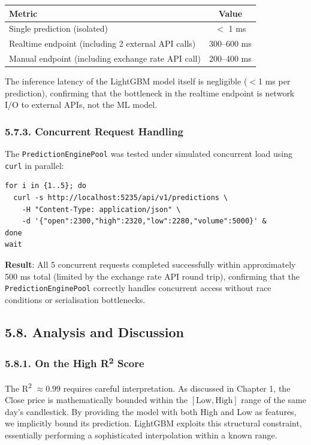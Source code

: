 \begin{center}
\begin{tabular}{|l|c|}
\hline
\textbf{Metric} & \textbf{Value}\\
\hline
Single prediction (isolated) & $<$ 1 ms\\
Realtime endpoint (including 2 external API calls) & 300--600 ms\\
Manual endpoint (including exchange rate API call) & 200--400 ms\\
\hline
\end{tabular}
\end{center}

The inference latency of the LightGBM model itself is negligible ($<$1 ms per prediction), confirming that the bottleneck in the realtime endpoint is network I/O to external APIs, not the ML model.

\subsubsection{5.7.3. Concurrent Request Handling}
The \texttt{PredictionEnginePool} was tested under simulated concurrent load using \texttt{curl} in parallel:

\begin{lstlisting}[language={}, numbers=none]
for i in {1..5}; do
  curl -s http://localhost:5235/api/v1/predictions \
    -H "Content-Type: application/json" \
    -d '{"open":2300,"high":2320,"low":2280,"volume":5000}' &
done
wait
\end{lstlisting}

\textbf{Result}: All 5 concurrent requests completed successfully within approximately 500 ms total (limited by the exchange rate API round trip), confirming that the \texttt{PredictionEnginePool} correctly handles concurrent access without race conditions or serialisation bottlenecks.

\subsection{5.8. Analysis and Discussion}

\subsubsection{5.8.1. On the High R\textsuperscript{2} Score}
The R\textsuperscript{2} $\approx 0.99$ requires careful interpretation. As discussed in Chapter 1, the Close price is mathematically bounded within the $[\text{Low}, \text{High}]$ range of the same day's candlestick. By providing the model with both High and Low as features, we implicitly bound its prediction. LightGBM exploits this structural constraint, essentially performing a sophisticated interpolation within a known range.

